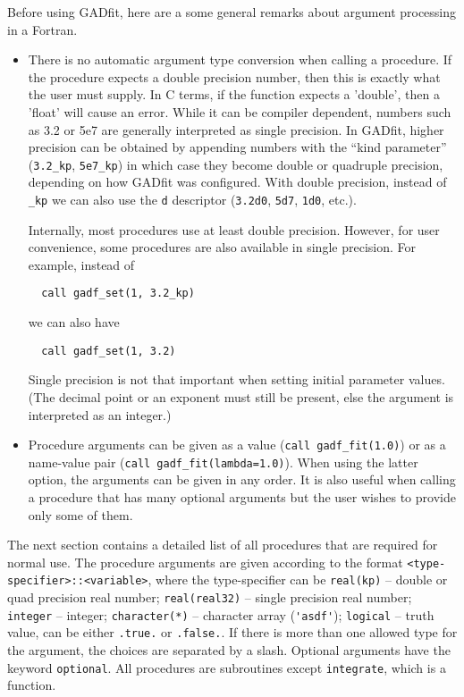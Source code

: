 \documentclass{article}
\begin{document}
Before using GADfit, here are a some general remarks about argument processing in a Fortran.
\begin{itemize}
\item There is no automatic argument type conversion when calling a procedure. If the procedure expects a double precision number, then this is exactly what the user must supply. In C terms, if the function expects a 'double', then a 'float' will cause an error. While it can be compiler dependent, numbers such as 3.2 or 5e7 are generally interpreted as single precision. In GADfit, higher precision can be obtained by appending numbers with the ``kind parameter'' (\verb+3.2_kp+, \verb+5e7_kp+) in which case they become double or quadruple precision, depending on how GADfit was configured. With double precision, instead of \verb+_kp+ we can also use the \texttt{d} descriptor (\texttt{3.2d0}, \texttt{5d7}, \texttt{1d0}, etc.).

Internally, most procedures use at least double precision. However, for user convenience, some procedures are also available in single precision. For example, instead of
\begin{verbatim}
  call gadf_set(1, 3.2_kp)
\end{verbatim}
  we can also have
\begin{verbatim}
  call gadf_set(1, 3.2)
\end{verbatim}
  Single precision is not that important when setting initial parameter values. (The decimal point or an exponent must still be present, else the argument is interpreted as an integer.)

\item Procedure arguments can be given as a value (\verb+call gadf_fit(1.0)+) or as a name-value pair (\verb+call gadf_fit(lambda=1.0)+). When using the latter option, the arguments can be given in any order. It is also useful when calling a procedure that has many optional arguments but the user wishes to provide only some of them.
\end{itemize}
The next section contains a detailed list of all procedures that are required for normal use. The procedure arguments are given according to the format \verb+<type-specifier>::<variable>+, where the type-specifier can be \verb+real(kp)+ -- double or quad precision real number; \verb+real(real32)+ -- single precision real number; \verb+integer+ -- integer; \verb+character(*)+ -- character array (\verb+'asdf'+); \verb+logical+ -- truth value, can be either \verb+.true.+ or \verb+.false.+. If there is more than one allowed type for the argument, the choices are separated by a slash. Optional arguments have the keyword \verb+optional+. All procedures are subroutines except \verb+integrate+, which is a function.
\end{document}

